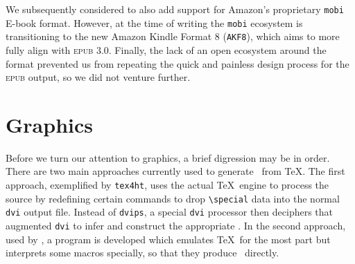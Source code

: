 \documentclass{llncs}
\def\ebook{\mbox{E-book}\xspace}
\def\epub{\textsc{epub}\xspace}
\begin{document}
We subsequently considered to also add support for Amazon's proprietary \texttt{mobi} \ebook format. However, at the time of writing the \texttt{mobi} ecosystem is transitioning to the new Amazon Kindle Format 8 (\texttt{AKF8}), which aims to more fully align with \epub 3.0. Finally, the lack of an open ecosystem around the format prevented us from repeating the quick and painless design process for the \epub output, so we did not venture further.



\section{Graphics}\label{graphics}
Before we turn our attention to graphics,
a brief digression may be in order.
There are two main approaches currently used to generate
\HTML\ from \TeX. The first approach,
exemplified by \texttt{tex4ht}, uses the actual \TeX\ engine
to process the source by redefining certain commands to drop
\verb|\special| data into the normal \texttt{dvi} output file.
Instead of \texttt{dvips}, a special \texttt{dvi} processor then deciphers
that augmented \texttt{dvi}
to infer and construct the appropriate \HTML.
In the second approach, used by \LaTeXML, a program
is developed which emulates \TeX\ for the most part
but interprets some macros
specially, so that they produce \XML\ directly.
\end{document}
